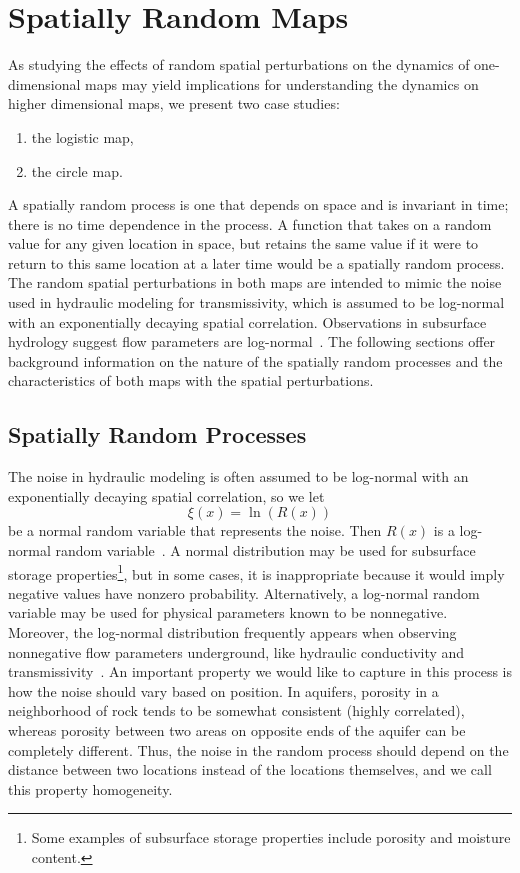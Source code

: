 \chapter{Spatially Random Maps}
As studying the effects of random spatial perturbations
on the dynamics of one-dimensional maps may yield implications for
understanding the dynamics on higher dimensional maps, we present two
case studies:
\begin{enumerate}
\item the logistic map,
\item the circle map.
\end{enumerate}
A spatially random process is one that depends on space and is
invariant in time; there is no time dependence in the process. A
function that takes on a random value for any given location in
space, but retains the same value if it were to return to this same
location at a later time would be a spatially random process. The random spatial perturbations in both maps are intended to mimic
the noise used in hydraulic modeling for transmissivity, which is assumed to be log-normal with an
exponentially decaying spatial correlation. Observations
in subsurface hydrology suggest flow parameters are
log-normal~\cite{gelhar}. The following sections offer background
information on the nature of the spatially random processes and the characteristics of both maps with the spatial perturbations. 
\section{Spatially Random Processes}\label{spatprocs}
The noise in hydraulic modeling is often assumed to be log-normal with an
exponentially decaying spatial correlation, so we let
\begin{equation}\label{R}
\xi(x)=\ln(R(x)) 
\end{equation}
be a normal random variable that represents the noise. Then
$R(x)$ is a log-normal random variable~\cite{gelhar}. A normal distribution may be used
for subsurface storage properties\footnote{Some examples of subsurface
storage properties include porosity and moisture content.}, but in some cases, it is
inappropriate because it would imply negative values have nonzero
probability. Alternatively, a log-normal random variable may
be used for physical parameters known to be nonnegative. Moreover, the log-normal distribution frequently appears when observing
nonnegative flow parameters underground, like hydraulic conductivity and
transmissivity~\cite{gelhar}. An important property we would like to
capture in this process is how the noise should vary based on
position. In aquifers, porosity in a neighborhood of rock tends to be
somewhat consistent (highly correlated), whereas porosity between two
areas on opposite ends of the aquifer can be completely
different. Thus, the noise in the random process should depend on the
distance between two locations instead of the locations themselves,
and we call this property homogeneity. 

